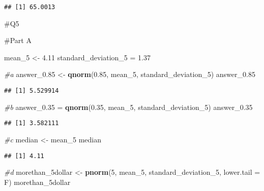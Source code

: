 \documentclass[
]{article}
\newenvironment{Shaded}{\begin{snugshade}}{\end{snugshade}}
\newcommand{\AttributeTok}[1]{\textcolor[rgb]{0.13,0.29,0.53}{#1}}
\newcommand{\CommentTok}[1]{\textcolor[rgb]{0.56,0.35,0.01}{\textit{#1}}}
\newcommand{\DecValTok}[1]{\textcolor[rgb]{0.00,0.00,0.81}{#1}}
\newcommand{\FloatTok}[1]{\textcolor[rgb]{0.00,0.00,0.81}{#1}}
\newcommand{\FunctionTok}[1]{\textcolor[rgb]{0.13,0.29,0.53}{\textbf{#1}}}
\newcommand{\NormalTok}[1]{#1}
\newcommand{\OtherTok}[1]{\textcolor[rgb]{0.56,0.35,0.01}{#1}}
\begin{document}
\begin{verbatim}
## [1] 65.0013
\end{verbatim}

\#Q5

\#Part A

\begin{Shaded}
\begin{Highlighting}[]
\NormalTok{mean\_5 }\OtherTok{\textless{}{-}} \FloatTok{4.11}
\NormalTok{standard\_deviation\_5 }\OtherTok{=} \FloatTok{1.37}
\end{Highlighting}
\end{Shaded}

\begin{Shaded}
\begin{Highlighting}[]
\CommentTok{\#a}
\NormalTok{answer\_0}\FloatTok{.85} \OtherTok{\textless{}{-}} \FunctionTok{qnorm}\NormalTok{(}\FloatTok{0.85}\NormalTok{, mean\_5, standard\_deviation\_5)}
\NormalTok{answer\_0}\FloatTok{.85}
\end{Highlighting}
\end{Shaded}

\begin{verbatim}
## [1] 5.529914
\end{verbatim}

\begin{Shaded}
\begin{Highlighting}[]
\CommentTok{\#b}
\NormalTok{answer\_0}\FloatTok{.35} \OtherTok{=} \FunctionTok{qnorm}\NormalTok{(}\FloatTok{0.35}\NormalTok{, mean\_5, standard\_deviation\_5)}
\NormalTok{answer\_0}\FloatTok{.35}
\end{Highlighting}
\end{Shaded}

\begin{verbatim}
## [1] 3.582111
\end{verbatim}

\begin{Shaded}
\begin{Highlighting}[]
\CommentTok{\#c}
\NormalTok{median }\OtherTok{\textless{}{-}}\NormalTok{ mean\_5}
\NormalTok{median}
\end{Highlighting}
\end{Shaded}

\begin{verbatim}
## [1] 4.11
\end{verbatim}

\begin{Shaded}
\begin{Highlighting}[]
\CommentTok{\#d}
\NormalTok{morethan\_5dollar }\OtherTok{\textless{}{-}} \FunctionTok{pnorm}\NormalTok{(}\DecValTok{5}\NormalTok{, mean\_5, standard\_deviation\_5, }\AttributeTok{lower.tail =}\NormalTok{ F)}
\NormalTok{morethan\_5dollar}
\end{Highlighting}
\end{Shaded}
\end{document}
